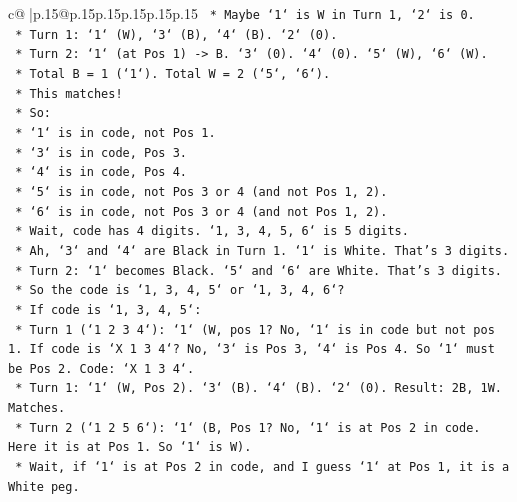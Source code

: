\documentclass{article}
\begin{document}
{\begin{supertabular}{c@{$\;$}|p{.15\linewidth}@{}p{.15\linewidth}p{.15\linewidth}p{.15\linewidth}p{.15\linewidth}p{.15\linewidth}}
{{{\texttt{                *   Maybe `1` is W in Turn 1, `2` is 0.} \\
\texttt{                    *   Turn 1: `1` (W), `3` (B), `4` (B). `2` (0).} \\
\texttt{                    *   Turn 2: `1` (at Pos 1) {-}> B. `3` (0). `4` (0). `5` (W), `6` (W).} \\
\texttt{                    *   Total B = 1 (`1`). Total W = 2 (`5`, `6`).} \\
\texttt{                    *   This matches!} \\
\texttt{                    *   So:} \\
\texttt{                        *   `1` is in code, not Pos 1.} \\
\texttt{                        *   `3` is in code, Pos 3.} \\
\texttt{                        *   `4` is in code, Pos 4.} \\
\texttt{                        *   `5` is in code, not Pos 3 or 4 (and not Pos 1, 2).} \\
\texttt{                        *   `6` is in code, not Pos 3 or 4 (and not Pos 1, 2).} \\
\texttt{                        *   Wait, code has 4 digits. `1, 3, 4, 5, 6` is 5 digits.} \\
\texttt{                        *   Ah, `3` and `4` are Black in Turn 1. `1` is White. That's 3 digits.} \\
\texttt{                        *   Turn 2: `1` becomes Black. `5` and `6` are White. That's 3 digits.} \\
\texttt{                        *   So the code is `1, 3, 4, 5` or `1, 3, 4, 6`?} \\
\texttt{                        *   If code is `1, 3, 4, 5`:} \\
\texttt{                            *   Turn 1 (`1 2 3 4`): `1` (W, pos 1? No, `1` is in code but not pos 1. If code is `X 1 3 4`? No, `3` is Pos 3, `4` is Pos 4. So `1` must be Pos 2. Code: `X 1 3 4`.} \\
\texttt{                            *   Turn 1: `1` (W, Pos 2). `3` (B). `4` (B). `2` (0). Result: 2B, 1W. Matches.} \\
\texttt{                            *   Turn 2 (`1 2 5 6`): `1` (B, Pos 1? No, `1` is at Pos 2 in code. Here it is at Pos 1. So `1` is W).} \\
\texttt{                            *   Wait, if `1` is at Pos 2 in code, and I guess `1` at Pos 1, it is a White peg.} \\
}}}
\end{supertabular}}
\end{document}
